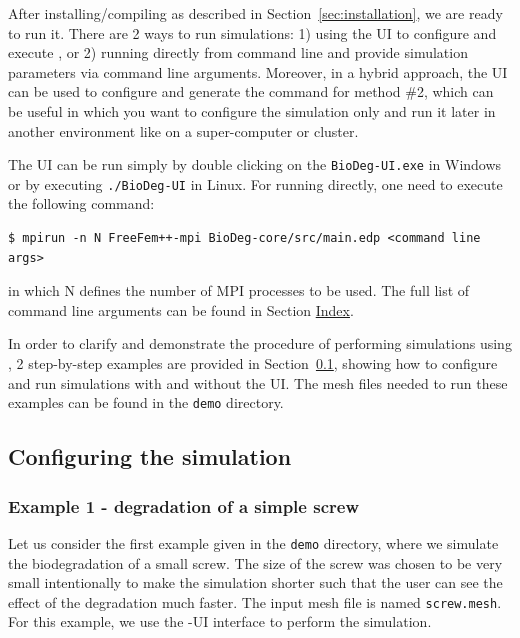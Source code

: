 After installing/compiling \biodeg{} as described in Section~\ref{sec:installation}, we are ready to run it. There are 2 ways to run \biodeg{} simulations: 1) using the UI to configure and execute \biodeg{}, or 2) running \biodeg{} directly from command line and provide simulation parameters via command line arguments. Moreover, in a hybrid approach, the UI can be used to configure and generate the command for method \#2, which can be useful in which you want to configure the simulation only and run it later in another environment like on a super-computer or cluster.

The UI can be run simply by double clicking on the \verb|BioDeg-UI.exe| in Windows or by executing \verb|./BioDeg-UI| in Linux. For running \biodeg{} directly, one need to execute the following command:
\begin{verbatim}
$ mpirun -n N FreeFem++-mpi BioDeg-core/src/main.edp <command line args>
\end{verbatim}
in which N defines the number of MPI processes to be used. The full list of command line arguments can be found in Section \hyperref[sec:index]{Index}.

In order to clarify and demonstrate the procedure of performing simulations using \biodeg{}, 2 step-by-step examples are provided in Section~\ref{sec:config}, showing how to configure and run simulations with and without the UI. The mesh files needed to run these examples can be found in the \verb|demo| directory.

\subsection{Configuring the simulation} \label{sec:config}


\subsubsection{Example 1 - degradation of a simple screw}\label{sec:example1}

Let us consider the first example given in the \verb|demo| directory, where we simulate the biodegradation of a small screw. The size of the screw was chosen to be very small intentionally to make the simulation shorter such that the user can see the effect of the degradation much faster. The input mesh file is named \verb|screw.mesh|. For this example, we use the \biodeg{}-UI interface to perform the simulation. 


